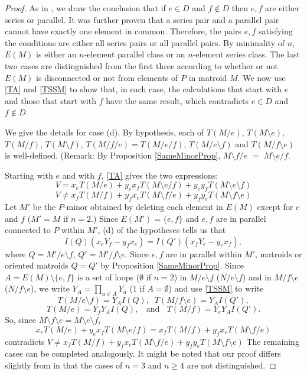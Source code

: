 \documentclass[12pt,leqno]{amsart}
\theoremstyle{remark}
\begin{document}
\begin{proof}
As in  \cite{Ellis-Monaghan-Traldi}, we draw the conclusion that
if $e\in D$ and $f\not\in D$ then $e, f$ are either series or parallel. 
It was further proven that a series pair and a parallel pair cannot
have exactly one element in common.  Therefore, the pairs $e,f$ satisfying 
the conditions are either all series pairs or all parallel pairs.  By 
minimality of $n$, $E(M)$ is either an $n$-element parallel class or an 
$n$-element series class.  The last two cases are distinguished from
the first three according to whether or not $E(M)$ is disconnected or not
from elements of $P$ in matroid $M$.  We now use \eqref{TA} and \eqref{TSSM}
to show that, in each case, the calculations that start with $e$ and 
those that start with $f$
have the same result, which contradicts $e\in D$ and $f\not\in D$.

We give the details for case (d).  By hypothesis, 
each of $T(M/e)$, $T(M\setminus e)$, $T(M/f)$, $T(M\setminus f)$,
$T(M/f/e)=T(M/e/f)$, $T(M/e\setminus f)$ and 
$T(M/f\setminus e)$ is well-defined.  (Remark:
By Proposition \ref{SameMinorProp},
$M\setminus f/e$ $=$ 
$M\setminus e/f$.  

Starting with $e$ and with $f$, \eqref{TA} gives the two expressions:
\[
V= x_e T(M/e) + y_e x_f T(M\setminus e /f) + y_e y_f T(M\setminus e\setminus f)
\]
\[
V\neq 
   x_f T(M/f) + y_f x_e T(M\setminus f /e) + y_f y_e T(M\setminus f\setminus e)
\]
Let $M'$ be the $P$-minor obtained by deleting each element
in $E(M)$ except for $e$ and $f$ ($M'=M$ if $n=2$.)
Since 
$E(M')=\{e,f\}$ and $e,f$ are in parallel connected to $P$ within
$M'$, (d) of the hypotheses  tells us that
\[
I(Q) (x_e Y_f - y_f x_e) =
I(Q') (x_f Y_e - y_e x_f ),
\]
where $Q=M'/e \setminus f$, $Q'=M'/f \setminus e$.  
Since $e,f$ are in parallel within $M'$,
matroids
or oriented matroids $Q=Q'$ by Proposition \ref{SameMinorProp}.
Since $A=E(M)\setminus\{e,f\}$ is a set of loops ($\emptyset$ if $n=2$)
in
$M/e\setminus f$ ($N/e\setminus f$) and 
in $M/f\setminus e$ ($N/f\setminus e$), we 
write $Y_A=\prod_{a\in A}Y_a$ ($1$ if $A=\emptyset$)
and use \eqref{TSSM} to write
\[
T(M/e\setminus f) = Y_A I(Q ),\;\;
T(M/f\setminus e) = Y_A I(Q' ),
\]
\[
T(M/e) = Y_f Y_A I(Q ),\;\;\text{ and }\;\;
T(M/f) = Y_e Y_A I(Q' ).
\]
So, since $M\setminus f\setminus e=M\setminus e\setminus f$,
\[
x_e T(M/e) + y_e x_f T(M\setminus e /f)
=
x_f T(M/f) + y_f x_e T(M\setminus f /e)
\]
contradicts 
$V\neq 
x_f T(M/f) + y_f x_e T(M\setminus f /e) + y_f y_e T(M\setminus f\setminus e)$
The remaining cases can be completed analogously.  It might be
noted that our proof differs slightly from \cite{Ellis-Monaghan-Traldi}
in that the cases of $n=3$ and $n\ge 4$ are not distinguished.
\end{proof}
\end{document}
